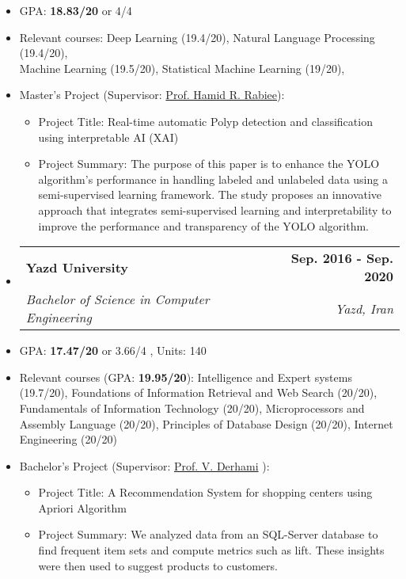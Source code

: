 \documentclass[letterpaper,11pt]{article}
\makeatletter
\newcommand{\resumeSubheading}[4]{
  \vspace{-2pt}\item
    \begin{tabular*}{1.0\textwidth}[t]{l@{\extracolsep{\fill}}r}
      \textbf{#1} & \textbf{\small #2} \\
    \textcolor{sgray} {\textit{\small#3}} & \textcolor{sgray}{ \textit{\small #4} }\\
    \end{tabular*}\vspace{-7pt}
}
\newcommand{\resumeSubHeadingListStart}{\begin{itemize}[leftmargin=0.0in, label={}]}
\newcommand{\resumeSubHeadingListEnd}{\end{itemize}}
\makeatother
\begin{document}
\begin{itemize}[itemsep=-3pt, parsep=5pt]
\item  GPA: \textbf{18.83/20} or 4/4

\item Relevant courses:
Deep Learning (19.4/20),
Natural Language Processing (19.4/20), \\
Machine Learning (19.5/20),
Statistical Machine Learning (19/20), 

\item Master's Project (Supervisor:  \hyperref[references]{Prof. Hamid R. Rabiee}):
\vspace*{-0.2cm}
\begin{itemize}[itemsep=-3pt, parsep=5pt]
\item Project Title: Real-time automatic Polyp detection and classification using interpretable AI (XAI)

\item Project Summary: 
The purpose of this paper is to enhance the YOLO algorithm's performance in handling labeled and unlabeled data using a semi-supervised learning framework. The study proposes an innovative approach that integrates semi-supervised learning and interpretability to improve the performance and transparency of the YOLO algorithm.
\end{itemize}
\end{itemize}  


  \resumeSubHeadingListStart
    \resumeSubheading
      {Yazd University}{Sep. 2016 - Sep. 2020}
      {Bachelor of Science in Computer Engineering}{Yazd, Iran}
  \resumeSubHeadingListEnd
  
\begin{itemize}[itemsep=-3pt, parsep=5pt,label={$\diamond$}]

\item GPA: \textbf{17.47/20} or 3.66/4 , Units: 140


\item  Relevant courses (GPA: \textbf{19.95/20}):
Intelligence and Expert systems (19.7/20),
Foundations of Information Retrieval and Web Search (20/20),
Fundamentals of Information Technology (20/20),
Microprocessors and Assembly Language (20/20),
Principles of Database Design (20/20),
Internet Engineering (20/20)

\item Bachelor's Project (Supervisor: \hyperref[references]{Prof. V. Derhami} ):
\vspace*{-0.2cm}
\begin{itemize}[itemsep=-3pt, parsep=5pt]
\item Project Title: 
A Recommendation System for shopping centers using Apriori Algorithm

\item Project Summary: 
We analyzed data from an SQL-Server database to find frequent item sets and compute metrics such as lift. These insights were then used to suggest products to customers.
\end{itemize}



\end{itemize}  
  
\end{document}

